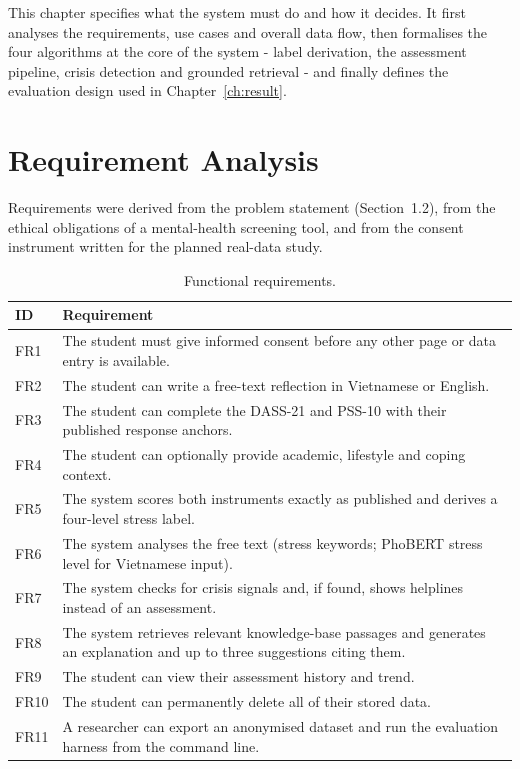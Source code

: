 This chapter specifies what the system must do and how it decides. It first analyses the requirements, use cases and overall data flow, then formalises the four algorithms at the core of the system - label derivation, the assessment pipeline, crisis detection and grounded retrieval - and finally defines the evaluation design used in Chapter~\ref{ch:result}.

\section{Requirement Analysis}
Requirements were derived from the problem statement (Section~1.2), from the ethical obligations of a mental-health screening tool, and from the consent instrument written for the planned real-data study.

\begin{table}[ht]
	\centering
	\caption{Functional requirements.}
	\label{tab:fr}
	\begin{tabularx}{\textwidth}{lL}
		\toprule
		ID   & Requirement \\ \midrule
		FR1  & The student must give informed consent before any other page or data entry is available. \\
		FR2  & The student can write a free-text reflection in Vietnamese or English. \\
		FR3  & The student can complete the DASS-21 and PSS-10 with their published response anchors. \\
		FR4  & The student can optionally provide academic, lifestyle and coping context. \\
		FR5  & The system scores both instruments exactly as published and derives a four-level stress label. \\
		FR6  & The system analyses the free text (stress keywords; PhoBERT stress level for Vietnamese input). \\
		FR7  & The system checks for crisis signals and, if found, shows helplines instead of an assessment. \\
		FR8  & The system retrieves relevant knowledge-base passages and generates an explanation and up to three suggestions citing them. \\
		FR9  & The student can view their assessment history and trend. \\
		FR10 & The student can permanently delete all of their stored data. \\
		FR11 & A researcher can export an anonymised dataset and run the evaluation harness from the command line. \\ \bottomrule
	\end{tabularx}
\end{table}

